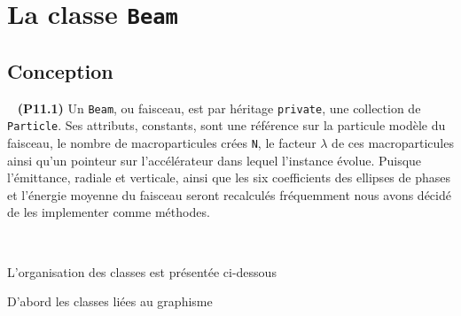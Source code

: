 \documentclass[12pt, letterpaper, twoside]{article}
\newcommand{\T}[1]{\texttt{#1}}
\begin{document}
\section{La classe \T{Beam}}

\subsection{Conception}

\ \linebreak
\noindent \textbf{(P11.1)} Un \T{Beam}, ou faisceau, est par héritage \T{private}, une collection de \T{Particle}. Ses attributs, constants, sont une référence sur la particule modèle du faisceau, le nombre de macroparticules crées \T{N}, le facteur $\lambda$ de ces macroparticules ainsi qu'un pointeur sur l'accélérateur dans lequel l'instance évolue. Puisque l'émittance, radiale et verticale, ainsi que les six coefficients des ellipses de phases et l'énergie moyenne du faisceau seront recalculés fréquemment nous avons décidé de les implementer comme méthodes. 

\ \bigskip

L'organisation des classes est présentée ci-dessous

D'abord les classes liées au graphisme

\ \linebreak
\ \linebreak
{}
\end{document}
